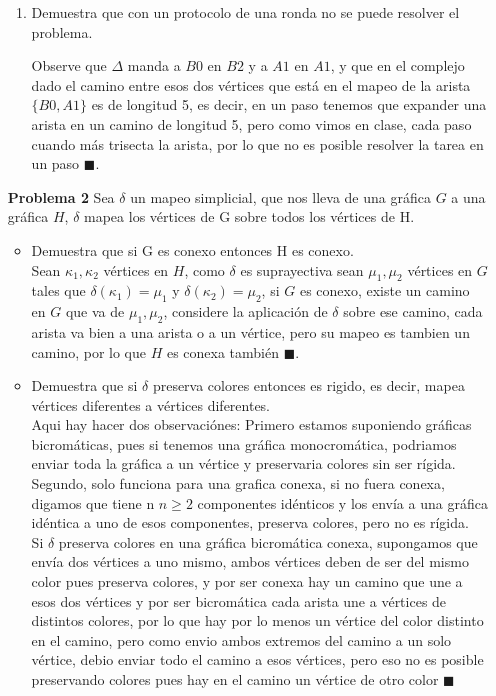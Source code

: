 \documentclass{article}
\begin{document}
\begin{enumerate}
\begin{enumerate}
\item Demuestra que con un protocolo de una ronda no se puede resolver
el problema.

  Observe que $\Delta$ manda a $B0$ en $B2$ y a $A1$ en $A1$, y que en el complejo dado el camino entre esos dos vértices que está en el mapeo de la arista $\{B0,A1\}  $ es de longitud 5, es decir, en un paso tenemos que expander una arista en un camino de longitud 5, pero como vimos en clase, cada paso cuando más trisecta la arista, por lo que no es posible resolver la tarea en un paso $\blacksquare$.

\end{enumerate}


\item[\bf{Problema 2}] Sea $\delta$ un mapeo simplicial, que nos lleva de una gráfica $G$ a una gráfica $H$, $\delta$ mapea los vértices de G sobre todos los vértices de H.

\begin{itemize}
\item Demuestra que si G es conexo entonces H es conexo.\\

Sean $\kappa_1 , \kappa_2 $ vértices en $H$, como $\delta$ es suprayectiva sean $\mu_1, \mu_2$ vértices en  $G$ tales que $\delta(\kappa_1)=\mu_1$ y $\delta(\kappa_2)=\mu_2$, si $G$ es conexo, existe un camino en $G$ que va de $\mu_1, \mu_2$, considere la aplicación de $\delta$ sobre ese camino, cada arista va bien a una arista o a un vértice, pero su mapeo es tambien un camino, por lo que $H$ es conexa también $\blacksquare$.

\item Demuestra que si $\delta$ preserva colores entonces es rigido, es decir, mapea vértices diferentes a vértices diferentes.\\

Aqui hay hacer dos observaciónes:
Primero estamos suponiendo gráficas bicromáticas, pues si tenemos una gráfica monocromática, podriamos enviar toda la gráfica a un vértice y preservaria colores sin ser rígida.
Segundo, solo funciona para una grafica conexa, si no fuera conexa, digamos que tiene n $n\ge2$ componentes idénticos y los envía a una gráfica idéntica a uno de esos componentes, preserva colores, pero no es rígida.\\

Si $\delta$ preserva colores en una gráfica bicromática conexa, supongamos que envía dos vértices a uno mismo, ambos vértices deben de ser del mismo color pues preserva colores, y por ser conexa hay un camino que une a esos dos vértices y por ser bicromática cada arista une a vértices de distintos colores, por lo que hay por lo menos un vértice del color distinto en el camino, pero como envio ambos extremos del camino a un solo vértice, debio enviar todo el camino a esos vértices, pero eso no es posible preservando colores pues hay en el camino un vértice de otro color $\blacksquare$


\end{itemize}
\end{enumerate}
\end{document}
